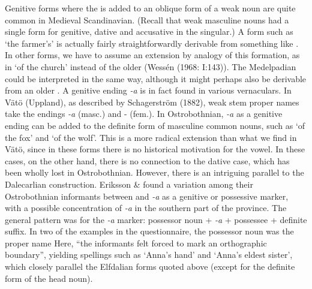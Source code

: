{{%
Genitive forms where the is added to an oblique form of a weak noun are quite common in Medieval Scandinavian. (Recall that weak masculine nouns had a single form for genitive, dative and accusative in the singular.) A form such as  ‘the farmer’s’ is actually fairly straightforwardly derivable from something like . In other forms, we have to assume an extension by analogy of this formation, as in  ‘of the church’ instead of the older  (Wessén (1968: I:143)). The Medelpadian  could be interpreted in the same way, although it might perhaps also be derivable from an older . A genitive ending\textit{ {}-a} is in fact found in various vernaculars. In Vätö (Uppland), as described by Schagerström (1882), weak stem proper names take the endings\textit{ {}-a} (masc.) and \nobreakdash- (fem.). In Ostrobothnian,\textit{ {}-a} as a genitive ending can be added to the definite form of masculine common nouns, such as  ‘of the fox’ and  ‘of the wolf’. This is a more radical extension than what we find in Vätö, since in these forms there is no historical motivation for the  vowel. In these cases, on the other hand, there is no connection to the dative case, which has been wholly lost in Ostrobothnian. However, there is an intriguing parallel to the Dalecarlian construction. Eriksson \& \citet[43]{Rendahl1999} found a variation among their Ostrobothnian informants between and\textit{ {}-a} as a genitive or possessive marker, with a possible concentration of\textit{ {}-a} in the southern part of the province. The general pattern was for the\textit{ {}-a} marker: possessor noun +\textit{ {}-a} + possessee + definite suffix. In two of the examples in the questionnaire, the possessor noun was the proper name Here, “the informants felt forced to mark an orthographic boundary”, yielding spellings such as  ‘Anna’s hand’ and ‘Anna’s eldest sister’, which closely parallel the Elfdalian forms quoted above (except for the definite form of the head noun).

}}
